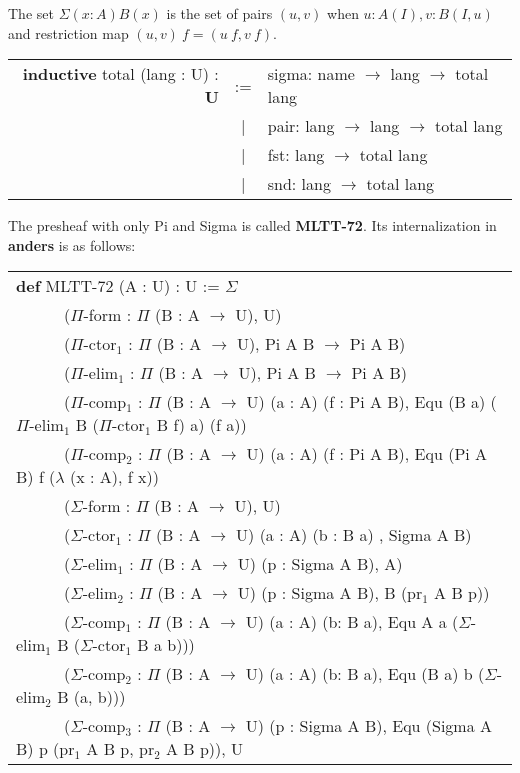 \documentclass[a4paper,UKenglish,cleveref, autoref, thm-restate]{lipics-v2021}
\begin{document}
\begin{definition}[Sigma]
The set $\Sigma(x:A)B(x)$ is the set of pairs $(u,v)$ when $u:A(I),v:B(I,u)$ and restriction map $(u,v)\ f=(u\ f,v\ f)$.
\end{definition}
\begin{table}[ht]
\begin{tabular}{rcl}
  \textbf{inductive} total (lang : U) : \textbf{U}& := & sigma: name $\rightarrow$ lang $\rightarrow$ total lang \\
  &|& pair: lang $\rightarrow$ lang $\rightarrow$ total lang \\
  &|& fst: lang $\rightarrow$ total lang \\
  &|& snd: lang $\rightarrow$ total lang \\
\end{tabular}
\end{table}

The presheaf with only Pi and Sigma is called \textbf{MLTT-72}. Its internalization in \textbf{anders} is as follows:

\begin{table}[ht!]
\begin{tabular}{l}
\textbf{def} MLTT-72 (A : U) : U := $\Sigma$ \\
\ \ \ \ \ \  ($\Pi$-form  : $\Pi$ (B : A $\rightarrow$ U), U) \\
\ \ \ \ \ \  ($\Pi$-ctor$_1$ : $\Pi$ (B : A $\rightarrow$ U), Pi A B $\rightarrow$ Pi A B) \\
\ \ \ \ \ \  ($\Pi$-elim$_1$ : $\Pi$ (B : A $\rightarrow$ U), Pi A B $\rightarrow$ Pi A B) \\
\ \ \ \ \ \  ($\Pi$-comp$_1$ : $\Pi$ (B : A $\rightarrow$ U) (a : A) (f : Pi A B), Equ (B a) ($\Pi$-elim$_1$ B ($\Pi$-ctor$_1$ B f) a) (f a)) \\
\ \ \ \ \ \  ($\Pi$-comp$_2$ : $\Pi$ (B : A $\rightarrow$ U) (a : A) (f : Pi A B), Equ (Pi A B) f ($\lambda$ (x : A), f x)) \\
\ \ \ \ \ \  ($\Sigma$-form  : $\Pi$ (B : A $\rightarrow$ U), U) \\
\ \ \ \ \ \  ($\Sigma$-ctor$_1$ : $\Pi$ (B : A $\rightarrow$ U) (a : A) (b : B a) , Sigma A B) \\
\ \ \ \ \ \  ($\Sigma$-elim$_1$ : $\Pi$ (B : A $\rightarrow$ U) (p : Sigma A B), A) \\
\ \ \ \ \ \  ($\Sigma$-elim$_2$ : $\Pi$ (B : A $\rightarrow$ U) (p : Sigma A B), B (pr$_1$ A B p)) \\
\ \ \ \ \ \  ($\Sigma$-comp$_1$ : $\Pi$ (B : A $\rightarrow$ U) (a : A) (b: B a), Equ A a ($\Sigma$-elim$_1$ B ($\Sigma$-ctor$_1$ B a b))) \\
\ \ \ \ \ \  ($\Sigma$-comp$_2$ : $\Pi$ (B : A $\rightarrow$ U) (a : A) (b: B a), Equ (B a) b ($\Sigma$-elim$_2$ B (a, b))) \\
\ \ \ \ \ \  ($\Sigma$-comp$_3$ : $\Pi$ (B : A $\rightarrow$ U) (p : Sigma A B), Equ (Sigma A B) p (pr$_1$ A B p, pr$_2$ A B p)), U
\end{tabular}
\end{table}
\end{document}
